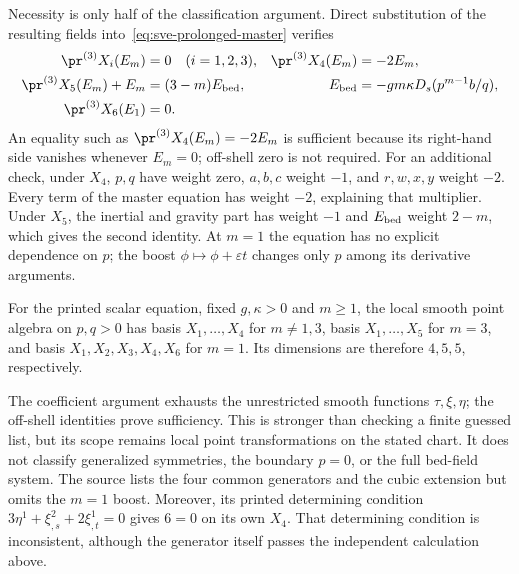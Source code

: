 Necessity is only half of the classification argument. Direct substitution
of the resulting fields into~\eqref{eq:sve-prolonged-master} verifies
\begin{align}
 \pr^{(3)}X_i(E_m)&=0\quad(i=1,2,3),&
 \pr^{(3)}X_4(E_m)&=-2E_m,\notag\\
 \pr^{(3)}X_5(E_m)+E_m&=(3-m)E_{\rm bed},&
 E_{\rm bed}&=-gm\kappa D_s(p^{m-1}b/q),\notag\\
 \pr^{(3)}X_6(E_1)&=0.
 \label{eq:sve-offshell-certificates}
\end{align}
An equality such as $\pr^{(3)}X_4(E_m)=-2E_m$ is sufficient because its
right-hand side vanishes whenever $E_m=0$; off-shell zero is not required.
For an additional check, under $X_4$, $p,q$ have weight zero, $a,b,c$
weight $-1$, and $r,w,x,y$ weight $-2$. Every term of the master equation
has weight $-2$, explaining that multiplier. Under $X_5$, the inertial
and gravity part has weight $-1$ and $E_{\rm bed}$ weight $2-m$,
which gives the second identity. At $m=1$ the equation has no explicit
dependence on $p$; the boost $\phi\mapsto\phi+\varepsilon t$ changes
only $p$ among its derivative arguments.

\begin{proposition}
For the printed scalar equation, fixed $g,\kappa>0$ and $m\geq1$, the local
smooth point algebra on $p,q>0$ has basis $X_1,\ldots,X_4$ for $m\ne1,3$,
basis $X_1,\ldots,X_5$ for $m=3$, and basis $X_1,X_2,X_3,X_4,X_6$ for
$m=1$. Its dimensions are therefore $4,5,5$, respectively.
\end{proposition}
The coefficient argument exhausts the unrestricted smooth functions
$\tau,\xi,\eta$; the off-shell identities prove sufficiency. This is
stronger than checking a finite guessed list, but its scope remains local
point transformations on the stated chart. It does not classify generalized
symmetries, the boundary $p=0$, or the full bed-field system.
The source lists the four common generators and the cubic extension but
omits the $m=1$ boost. Moreover, its printed determining condition
$3\eta^1+\xi^2_{,s}+2\xi^1_{,t}=0$ gives $6=0$ on its own $X_4$.
That determining condition is inconsistent, although the generator itself
passes the independent calculation above.

